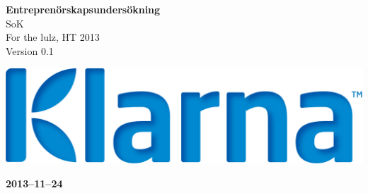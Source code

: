 \documentclass[pdftex, fontsize=11pt, a4paper]{scrbook}
\begin{document}
\begin{titlepage}
\thispagestyle{empty}
\begin{center}
	\vspace*{4\baselineskip}

	\textbf{\huge Entreprenörskapsundersökning} \\
	\vspace*{0.5\baselineskip}
	{\large  SoK} \\
	\vspace*{0.5\baselineskip}
	{\large  For the lulz, HT 2013} \\
	\vspace*{0.5\baselineskip}
	{\large  Version 0.1}


	\vspace*{6\baselineskip}
	\includegraphics[width=\linewidth]{KlarnaLogo}


	\normalfont
	\small
	\vfill


	\vspace*{2\baselineskip}

	\textbf{2013--11--24} \\
	[2\baselineskip]
\end{center}

\end{titlepage}
\end{document}

